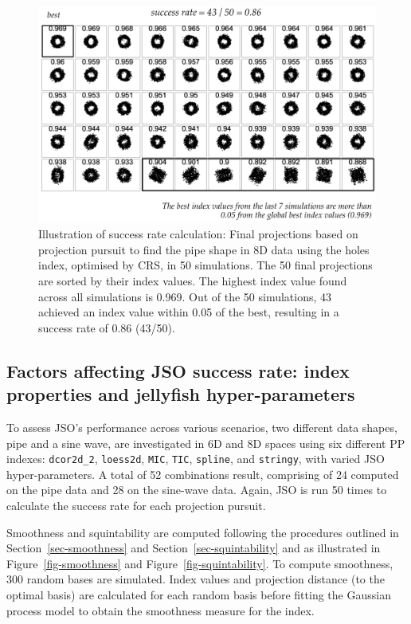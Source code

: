 \documentclass[
  12pt,
]{interact}
\theoremstyle{plain}
\begin{document}
\begin{figure}

{\centering \includegraphics[width=4.52in,height=\textheight]{figures/success-rate.png}

}

\caption{\label{fig-success-rate}Illustration of success rate
calculation: Final projections based on projection pursuit to find the
pipe shape in 8D data using the holes index, optimised by CRS, in 50
simulations. The 50 final projections are sorted by their index values.
The highest index value found across all simulations is 0.969. Out of
the 50 simulations, 43 achieved an index value within 0.05 of the best,
resulting in a success rate of 0.86 (43/50).}

\end{figure}

\hypertarget{sec-app-2}{%
\subsection{Factors affecting JSO success rate: index properties and
jellyfish hyper-parameters}\label{sec-app-2}}

To assess JSO's performance across various scenarios, two different data
shapes, pipe and a sine wave, are investigated in 6D and 8D spaces using
six different PP indexes: \texttt{dcor2d\_2}, \texttt{loess2d},
\texttt{MIC}, \texttt{TIC}, \texttt{spline}, and \texttt{stringy}, with
varied JSO hyper-parameters. A total of 52 combinations result,
comprising of 24 computed on the pipe data and 28 on the sine-wave data.
Again, JSO is run 50 times to calculate the success rate for each
projection pursuit.

Smoothness and squintability are computed following the procedures
outlined in Section~\ref{sec-smoothness} and
Section~\ref{sec-squintability} and as illustrated in
Figure~\ref{fig-smoothness} and Figure~\ref{fig-squintability}. To
compute smoothness, 300 random bases are simulated. Index values and
projection distance (to the optimal basis) are calculated for each
random basis before fitting the Gaussian process model to obtain the
smoothness measure for the index.
\end{document}
